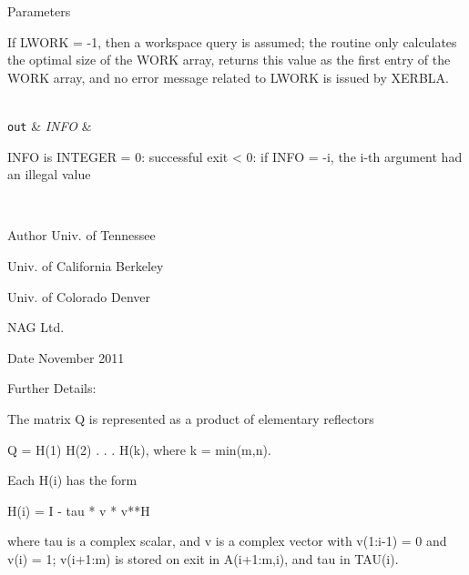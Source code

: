 \begin{DoxyParams}[1]{Parameters}
\begin{DoxyVerb}
          If LWORK = -1, then a workspace query is assumed; the routine
          only calculates the optimal size of the WORK array, returns
          this value as the first entry of the WORK array, and no error
          message related to LWORK is issued by XERBLA.\end{DoxyVerb}
\\
\hline
\mbox{\tt out}  & {\em I\+N\+F\+O} & \begin{DoxyVerb}          INFO is INTEGER
          = 0:  successful exit
          < 0:  if INFO = -i, the i-th argument had an illegal value\end{DoxyVerb}
 \\
\hline
\end{DoxyParams}
\begin{DoxyAuthor}{Author}
Univ. of Tennessee 

Univ. of California Berkeley 

Univ. of Colorado Denver 

N\+A\+G Ltd. 
\end{DoxyAuthor}
\begin{DoxyDate}{Date}
November 2011 
\end{DoxyDate}
\begin{DoxyParagraph}{Further Details\+: }
\begin{DoxyVerb}  The matrix Q is represented as a product of elementary reflectors

     Q = H(1) H(2) . . . H(k), where k = min(m,n).

  Each H(i) has the form

     H(i) = I - tau * v * v**H

  where tau is a complex scalar, and v is a complex vector with
  v(1:i-1) = 0 and v(i) = 1; v(i+1:m) is stored on exit in A(i+1:m,i),
  and tau in TAU(i).\end{DoxyVerb}
 
\end{DoxyParagraph}
\hypertarget{group__complex16GEcomputational_ga3e62c39db15928f660b34d3a107aee85}{}
